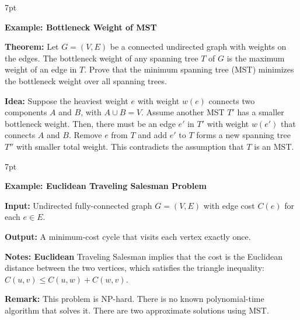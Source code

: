 \documentclass[10pt]{article}
\newenvironment{formal}[2]{%
	\def\FrameCommand{%
		\hspace{1pt}%
		{\color{#1}\vrule width 2pt}%
		{\color{#2}\vrule width 4pt}%
		\colorbox{#2}%
	}%
	\MakeFramed{\advance\hsize-\width\FrameRestore}%
	\noindent\hspace{-4.55pt}%
	\begin{adjustwidth}{}{7pt}%
		\vspace{2pt}\vspace{2pt}%
	}
	{%
		\vspace{2pt}\end{adjustwidth}\endMakeFramed%
}
\begin{document}
\begin{formal}{Brown}{brownshade}

	\textbf{Example: Bottleneck Weight of MST}

	\textbf{Theorem:} Let $G = (V,E)$ be a connected undirected graph with weights on the edges. The bottleneck weight of any spanning tree $T$ of $G$ is the maximum weight of an edge in $T$. Prove that the minimum spanning tree (MST) minimizes the bottleneck weight over all spanning trees.

	\textbf{Idea:} Suppose the heaviest weight $e$ with weight $w(e)$ connects two components $A$ and $B$, with $A \cup B = V$. Assume another MST $T'$ has a smaller bottleneck weight. Then, there must be an edge $e'$ in $T'$ with weight $w(e')$ that connects $A$ and $B$. Remove $e$ from $T$ and add $e'$ to $T$ forms a new spanning tree $T''$ with smaller total weight. This contradicts the assumption that $T$ is an MST.

\end{formal}

\begin{formal}{Brown}{brownshade}

	\textbf{Example: Euclidean Traveling Salesman Problem}

	\textbf{Input:} Undirected fully-connected graph $G = (V, E)$ with edge cost $C(e)$ for each $e \in E$.

	\textbf{Output:} A minimum-cost cycle that visits each vertex exactly once.

	\textbf{Notes: Euclidean} Traveling Salesman implies that the cost is the Euclidean distance between the two vertices, which satisfies the triangle inequality: $C(u, v) \leq C(u, w) + C(w, v)$.

	\textbf{Remark:} This problem is NP-hard. There is no known polynomial-time algorithm that solves it. There are two approximate solutions using MST.

\end{formal}
\end{document}
